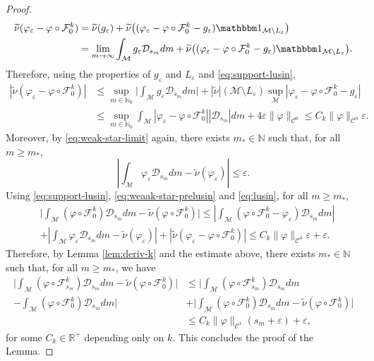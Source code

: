 \documentclass{amsart}
\numberwithin{equation}{section}
\newcommand\ve{\varepsilon}
\newcommand\vf{\varphi}
\renewcommand{\ge}{\geqslant}
\renewcommand{\le}{\leqslant}
\newcommand\cC{{\mathcal C}}
\newcommand\cF{{\mathcal F}}
\newcommand\cM{{\mathcal M}}
\newcommand\bN{{\mathbb N}}
\newcommand\bR{{\mathbb R}}
\newcommand{\Deriv}{\mathcal D}
\begin{document}
\begin{proof}
\[
\begin{split}
 \widetilde \nu ( \vf_{\ve} - \vf \circ \cF_0^k) &= \widetilde \nu (g_{\ve}) + \widetilde \nu \bigl(( \vf_{\ve} - \vf \circ \cF_0^k - g_{\ve})\mathbbm 1_{\cM \setminus L_{\ve}}\bigr) \\
&= \lim_{m \to \infty}\int_{\cM} g_{\ve}\Deriv_{s_m}dm + \widetilde \nu \bigl(( \vf_{\ve} - \vf \circ \cF_0^k - g_{\ve})\mathbbm 1_{\cM \setminus L_{\ve}}\bigr).
\end{split}
\]
Therefore, using the properties of \(g_{\ve}\) and \(L_{\ve}\) and \eqref{eq:support-lusin},
\begin{equation}\label{eq:lusin}
\begin{split}
|\widetilde \nu ( \vf_{\ve} \!-\! \vf \circ \cF_0^k)| &\le \!\!\sup_{m \in \bN_0}\!\biggl|\int_{\cM}\!\!\!g_{\ve}\Deriv_{s_m}dm\biggr| + |\widetilde \nu|(\cM \!\setminus \!L_{\ve})\sup_{\cM}|  \vf_{\ve} \! - \! \vf \circ \cF_0^k \! - \! g_{\ve}|\\
&\le \sup_{m \in \bN_0}\int_{\cM} \!\!| \vf_{\ve} - \vf \circ \cF_{0}^k| |\Deriv_{s_m}| dm + 4\ve\|\vf\|_{\cC^0} \le C_k\|\vf\|_{\cC^0}\ve.
\end{split}
\end{equation}
Moreover, by \eqref{eq:weak-star-limit} again, there exists \(m_{*} \in \bN\) such that, for all \(m \ge m_{*}\), 
\begin{equation}\label{eq:weaak-star-prelusin}
\left|\int_{\cM} \vf_{\ve} \Deriv_{s_m} dm - \widetilde \nu (\vf_{\ve})\right| \le \ve.
\end{equation}
Using \eqref{eq:support-lusin}, \eqref{eq:weaak-star-prelusin} and \eqref{eq:lusin}, for all \(m \ge m_{*}\),
\[
\begin{split}
&\Biggl|\int_{\cM} (\vf \circ \cF_{0}^k) \Deriv_{s_m} dm -  \widetilde \nu (\vf \circ \cF_0^k)\Biggr| \le \left|\int_{\cM} (\vf \circ \cF_{0}^k - \vf_{\ve}) \Deriv_{s_m} dm\right|\\
&+ \left|\int_{\cM} \vf_{\ve} \Deriv_{s_m} dm - \widetilde \nu (\vf_{\ve})\right| + \left|\widetilde \nu (\vf_{\ve} - \vf\circ \cF_0^k)\right| \le C_k \|\vf\|_{\cC^0}\ve + \ve.
\end{split}
\]
Therefore, by Lemma \ref{lem:deriv-k} and the estimate above, there exists \(m_{*} \in \bN\) such that, for all \(m \ge m_{*}\), we have
\[
\begin{split}
\Biggl| \int_{\cM} (\vf \circ \cF_{s_{m}}^k) \Deriv_{s_m} dm -  \widetilde \nu (\vf \circ \cF_0^k)\Biggr|&
\le \Biggl| \int_{\cM} (\vf \circ \cF_{s_{m}}^k) \Deriv_{s_m} dm\\- \int_{\cM} (\vf \circ \cF_{0}^k) \Deriv_{s_m} dm\Biggl|
& + \Biggl|\int_{\cM} (\vf \circ \cF_{0}^k) \Deriv_{s_m} dm -  \widetilde \nu (\vf \circ \cF_0^k)\Biggr|\\
& \le  C_k \|\vf\|_{\cC^1} \left(s_{m} + \ve\right) + \ve,
\end{split}
\]
for some \(C_k \in \bR^+\) depending only on \(k\). This concludes the proof of the Lemma.
\end{proof}
\end{document}
